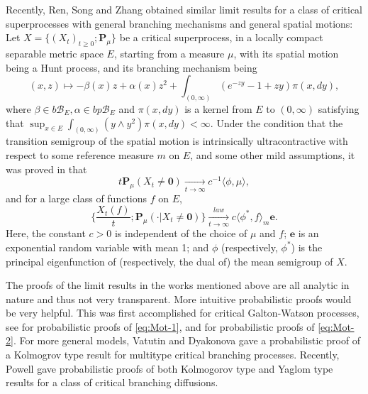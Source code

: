 	Recently, Ren, Song and Zhang \cite{RenSongZhang2015Limit} obtained similar limit results for a class of critical superprocesses with general branching mechanisms and general spatial motions:
	Let $X=\{(X_t)_{t\geq 0};\mathbf P_\mu\}$ be a critical superprocess, in a locally compact separable metric space $E$, starting from a measure $\mu$, with its spatial motion being a Hunt process, and its branching mechanism being
\[
	(x,z) \mapsto -\beta(x)z + \alpha(x)z^2 + \int_{(0,\infty)} (e^{-zy}-1+zy)\pi(x,dy),
\]
	where $\beta\in b\mathscr B_E,\alpha\in bp\mathscr B_E$ and $\pi(x,dy)$ is a kernel from $E$ to $(0,\infty)$ satisfying that $\sup_{x\in E}\int_{(0,\infty)}(y\wedge y^2)\pi(x,dy)<\infty$.
	Under the condition that the transition semigroup of the spatial motion is intrinsically ultracontractive with respect to some reference measure $m$ on $E$, and some other mild assumptions, it was proved in \cite{RenSongZhang2015Limit} that
\begin{equation}
\label{eq:Mot-3}
	t\mathbf P_\mu(X_t\neq \mathbf 0)
	\xrightarrow[t\to\infty]{} c^{-1} \langle \phi,\mu \rangle,
\end{equation}
	and for a large class of functions $f$ on $E$,
\begin{equation}
\label{eq:Mot-4}
	\big\{\frac{X_t(f)}{t};\mathbf P_\mu(\cdot|X_t \neq \mathbf 0)\big\}
\xrightarrow[t\to\infty]{law} c \langle \phi^*, f\rangle_m \mathbf e.
\end{equation}
	Here, the constant $c>0$ is independent of the choice of $\mu$ and $f$;
	$\mathbf e$ is an exponential  random variable with mean 1;
	and $\phi$ (respectively, $\phi^*$) is the principal eigenfunction of (respectively, the dual of) the mean semigroup of $X$.
\par
	The proofs of the limit results in the works mentioned above are all analytic in nature and thus not very transparent.
	More intuitive probabilistic proofs would be very helpful.
	This was first accomplished for critical Galton-Watson processes, see \cite{Geiger1999Elementary, LyonsPemantlePeres1995Conceptual} for probabilistic proofs of \eqref{eq:Mot-1}, and \cite{Geiger2000A-new-proof, LyonsPemantlePeres1995Conceptual, RenSongSun2018A-2-spine} for probabilistic proofs of \eqref{eq:Mot-2}.
	For more general models, Vatutin and Dyakonova \cite{VatutinDyakonova2001The-survival} gave a probabilistic proof of a Kolmogrov type result for multitype critical branching processes.
	Recently, Powell \cite{Powell2015An-invariance} gave probabilistic proofs of both Kolmogorov type and Yaglom type results for a class of critical branching diffusions.
